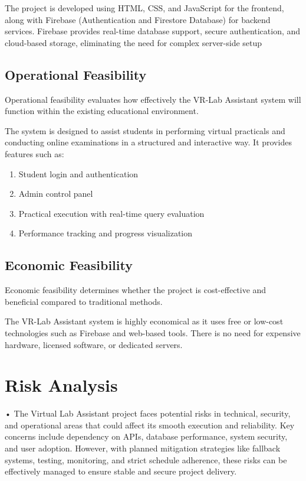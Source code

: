 The project is developed using HTML, CSS, and JavaScript for the frontend, along with Firebase (Authentication and Firestore Database) for backend services. Firebase provides real-time database support, secure authentication, and cloud-based storage, eliminating the need for complex server-side setup


\subsection{Operational Feasibility}

Operational feasibility evaluates how effectively the VR-Lab Assistant system will function within the existing educational environment.

The system is designed to assist students in performing virtual practicals and conducting online examinations in a structured and interactive way. It provides features such as:
\begin{enumerate}
\item Student login and authentication
\item Admin control panel
\item Practical execution with real-time query evaluation
\item Performance tracking and progress visualization
\end{enumerate}
\subsection{Economic Feasibility}
Economic feasibility determines whether the project is cost-effective and beneficial compared to traditional methods.

The VR-Lab Assistant system is highly economical as it uses free or low-cost technologies such as Firebase and web-based tools. There is no need for expensive hardware, licensed software, or dedicated servers.



\section{Risk Analysis}
• The Virtual Lab Assistant project faces potential risks in technical, security, and
operational areas that could affect its smooth execution and reliability. Key concerns
include dependency on APIs, database performance, system security, and user
adoption. However, with planned mitigation strategies like fallback systems, testing,
monitoring, and strict schedule adherence, these risks can be effectively managed to
ensure stable and secure project delivery.

